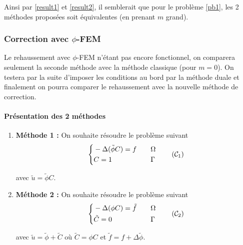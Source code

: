 Ainsi par \ref{result1} et \ref{result2}, il semblerait que pour le problème \ref{pb1}, les 2 méthodes proposées soit équivalentes (en prenant $m$ grand).


\setcounter{equation}{0}

\subsubsection{Correction avec $\phi$-FEM}

\begin{Rem}
	Le rehaussement avec $\phi$-FEM n'étant pas encore fonctionnel, on comparera seulement la seconde méthode avec la méthode classique (pour $m=0$). On testera par la suite d'imposer les conditions au bord par la méthode duale et finalement on pourra comparer le rehaussement avec la nouvelle méthode de correction.
\end{Rem}


\paragraph{Présentation des 2 méthodes}

\begin{enumerate}[label=\textbullet]
	\item \textbf{Méthode 1 : }
	On souhaite résoudre le problème suivant
	\begin{equation}
		\label{pbc1_phifem}
		\left\{\begin{aligned}
			&-\Delta (\tilde{\phi}C)=f \quad &&\Omega \\
			&C=1 \quad &&\Gamma
		\end{aligned}\right. \tag{$\mathcal{C}_1$}
	\end{equation}
	
	avec $\tilde{u}=\tilde{\phi}C$.
	
	\item \textbf{Méthode 2 : } On souhaite résoudre le problème suivant
	\begin{equation}
		\label{pbc2_phifem}
		\left\{\begin{aligned}
			&-\Delta(\phi C)=\tilde{f} \quad &&\Omega \\
			&\tilde{C}=0 \quad &&\Gamma
		\end{aligned}\right. \tag{$\mathcal{C}_2$}
	\end{equation}
	
	avec $\tilde{u}=\tilde{\phi}+\tilde{C}$ où $\tilde{C}=\phi C$ et $\tilde{f}=f+\Delta\tilde{\phi}$.
\end{enumerate}

